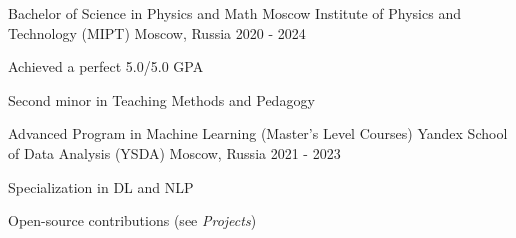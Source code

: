 
\begin{cventries}
  \cventry
    {Bachelor of Science in Physics and Math} %
    {Moscow Institute of Physics and Technology (MIPT)} %
    {Moscow, Russia} %
    {2020 - 2024} %
    {
        \begin{cvitems}
         \item { Achieved a perfect 5.0/5.0 GPA }
         \item { Second minor in Teaching Methods and Pedagogy }
        \end{cvitems}
    }
    
  \cventry
    {Advanced Program in Machine Learning (Master's Level Courses)} %
    {Yandex School of Data Analysis (YSDA)}
    {Moscow, Russia}
    {2021 - 2023}
    {
      \begin{cvitems} %
        \item { Specialization in DL and NLP }
        \item { Open-source contributions (see \textit{Projects}) }
      \end{cvitems}
    }
\end{cventries}
